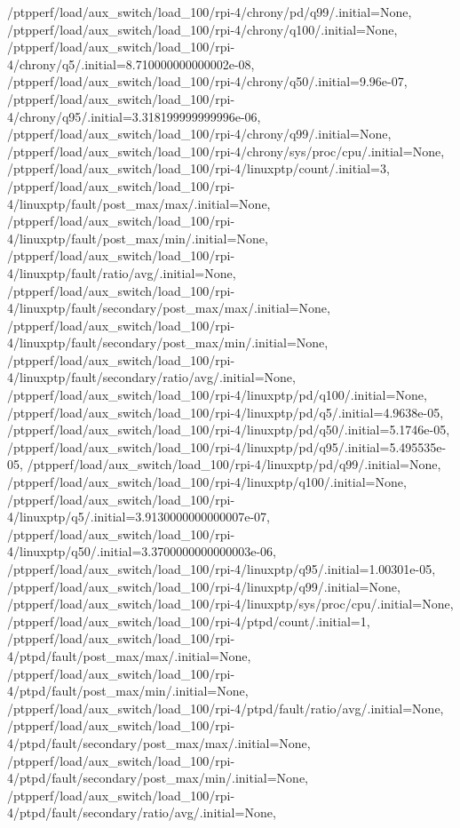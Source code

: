 {    /ptpperf/load/aux_switch/load_100/rpi-4/chrony/pd/q99/.initial=None,
    /ptpperf/load/aux_switch/load_100/rpi-4/chrony/q100/.initial=None,
    /ptpperf/load/aux_switch/load_100/rpi-4/chrony/q5/.initial=8.710000000000002e-08,
    /ptpperf/load/aux_switch/load_100/rpi-4/chrony/q50/.initial=9.96e-07,
    /ptpperf/load/aux_switch/load_100/rpi-4/chrony/q95/.initial=3.318199999999996e-06,
    /ptpperf/load/aux_switch/load_100/rpi-4/chrony/q99/.initial=None,
    /ptpperf/load/aux_switch/load_100/rpi-4/chrony/sys/proc/cpu/.initial=None,
    /ptpperf/load/aux_switch/load_100/rpi-4/linuxptp/count/.initial=3,
    /ptpperf/load/aux_switch/load_100/rpi-4/linuxptp/fault/post_max/max/.initial=None,
    /ptpperf/load/aux_switch/load_100/rpi-4/linuxptp/fault/post_max/min/.initial=None,
    /ptpperf/load/aux_switch/load_100/rpi-4/linuxptp/fault/ratio/avg/.initial=None,
    /ptpperf/load/aux_switch/load_100/rpi-4/linuxptp/fault/secondary/post_max/max/.initial=None,
    /ptpperf/load/aux_switch/load_100/rpi-4/linuxptp/fault/secondary/post_max/min/.initial=None,
    /ptpperf/load/aux_switch/load_100/rpi-4/linuxptp/fault/secondary/ratio/avg/.initial=None,
    /ptpperf/load/aux_switch/load_100/rpi-4/linuxptp/pd/q100/.initial=None,
    /ptpperf/load/aux_switch/load_100/rpi-4/linuxptp/pd/q5/.initial=4.9638e-05,
    /ptpperf/load/aux_switch/load_100/rpi-4/linuxptp/pd/q50/.initial=5.1746e-05,
    /ptpperf/load/aux_switch/load_100/rpi-4/linuxptp/pd/q95/.initial=5.495535e-05,
    /ptpperf/load/aux_switch/load_100/rpi-4/linuxptp/pd/q99/.initial=None,
    /ptpperf/load/aux_switch/load_100/rpi-4/linuxptp/q100/.initial=None,
    /ptpperf/load/aux_switch/load_100/rpi-4/linuxptp/q5/.initial=3.9130000000000007e-07,
    /ptpperf/load/aux_switch/load_100/rpi-4/linuxptp/q50/.initial=3.3700000000000003e-06,
    /ptpperf/load/aux_switch/load_100/rpi-4/linuxptp/q95/.initial=1.00301e-05,
    /ptpperf/load/aux_switch/load_100/rpi-4/linuxptp/q99/.initial=None,
    /ptpperf/load/aux_switch/load_100/rpi-4/linuxptp/sys/proc/cpu/.initial=None,
    /ptpperf/load/aux_switch/load_100/rpi-4/ptpd/count/.initial=1,
    /ptpperf/load/aux_switch/load_100/rpi-4/ptpd/fault/post_max/max/.initial=None,
    /ptpperf/load/aux_switch/load_100/rpi-4/ptpd/fault/post_max/min/.initial=None,
    /ptpperf/load/aux_switch/load_100/rpi-4/ptpd/fault/ratio/avg/.initial=None,
    /ptpperf/load/aux_switch/load_100/rpi-4/ptpd/fault/secondary/post_max/max/.initial=None,
    /ptpperf/load/aux_switch/load_100/rpi-4/ptpd/fault/secondary/post_max/min/.initial=None,
    /ptpperf/load/aux_switch/load_100/rpi-4/ptpd/fault/secondary/ratio/avg/.initial=None,
}
